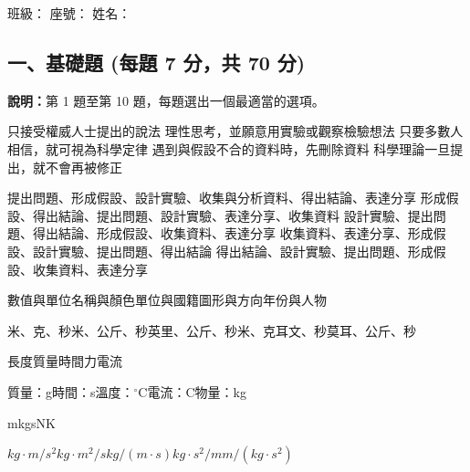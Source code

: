 \documentclass[10pt,a4paper]{article}
\begin{document}
\examheader

\noindent \hspace*{\fill} \large 班級：\underline{\hspace{1.5cm}} 座號：\underline{\hspace{1cm}} 姓名：\underline{\hspace{2.5cm}}

\vspace{1.2em}

\subsection*{一、基礎題 (每題 7 分，共 70 分)}
\begin{center}
    \begin{tcolorbox}[colframe=black, colback=white, halign=left, width=\textwidth, arc=2mm]
        \small \textbf{說明：}第 1 題至第 10 題，每題選出一個最適當的選項。
    \end{tcolorbox}
\end{center}

{只接受權威人士提出的說法}
{理性思考，並願意用實驗或觀察檢驗想法}
{只要多數人相信，就可視為科學定律}
{遇到與假設不合的資料時，先刪除資料}
{科學理論一旦提出，就不會再被修正}

{提出問題、形成假設、設計實驗、收集與分析資料、得出結論、表達分享}
{形成假設、得出結論、提出問題、設計實驗、表達分享、收集資料}
{設計實驗、提出問題、得出結論、形成假設、收集資料、表達分享}
{收集資料、表達分享、形成假設、設計實驗、提出問題、得出結論}
{得出結論、設計實驗、提出問題、形成假設、收集資料、表達分享}

{數值與單位}{名稱與顏色}{單位與國籍}{圖形與方向}{年份與人物}

{米、克、秒}{米、公斤、秒}{英里、公斤、秒}{米、克耳文、秒}{莫耳、公斤、秒}

{長度}{質量}{時間}{力}{電流}

{質量：g}{時間：s}{溫度：$^\circ$C}{電流：C}{物量：kg}

{m}{kg}{s}{N}{K}

{$kg\cdot m/s^2$}{$kg\cdot m^2/s$}{$kg/(m\cdot s)$}{$kg\cdot s^2/m$}{$m/(kg\cdot s^2)$}
\end{document}
